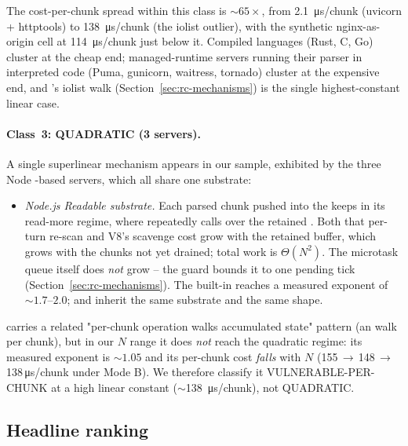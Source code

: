 The cost-per-chunk spread within this class is
$\sim 65\times$, from \SI{2.1}{\micro\second}/chunk (uvicorn +
httptools) to \SI{138}{\micro\second}/chunk (the 
iolist outlier), with the synthetic nginx-as-origin cell at
\SI{114}{\micro\second}/chunk just below it.
Compiled languages (Rust, C, Go) cluster at the cheap end;
managed-runtime servers running their parser in interpreted code
(Puma, gunicorn, waitress, tornado) cluster at the expensive end,
and 's iolist walk (Section~\ref{sec:rc-mechanisms})
is the single highest-constant linear case.

\paragraph{Class~3: QUADRATIC (3 servers).}
A single superlinear mechanism appears in our sample, exhibited
by the three Node -based servers, which all
share one substrate:

\begin{itemize}
  \item \emph{Node.js Readable substrate.} Each parsed chunk
    pushed into the  keeps 
    in its read-more regime, where 
    repeatedly calls  over the retained
    . Both that per-turn re-scan
    and V8's scavenge cost grow with the retained buffer, which
    grows with the chunks not yet drained; total work is
    $\Theta(N^2)$. The microtask queue itself does \emph{not}
    grow -- the  guard bounds it to one
    pending tick (Section~\ref{sec:rc-mechanisms}). The built-in
     reaches a measured exponent of
    $\sim 1.7$--$2.0$;  and  inherit
    the same substrate and the same shape.
\end{itemize}

 carries a related "per-chunk operation walks
accumulated state" pattern (an 
walk per chunk), but in our $N$ range it does \emph{not} reach
the quadratic regime: its measured exponent is $\sim 1.05$ and
its per-chunk cost \emph{falls} with $N$
(155\,$\to$\,148\,$\to$\,138\,\si{\micro\second}/chunk under
Mode B). We therefore classify it VULNERABLE-PER-CHUNK at a high
linear constant ($\sim$\SI{138}{\micro\second}/chunk), not
QUADRATIC.

\subsection{Headline ranking}
\label{sec:synth-rank}

